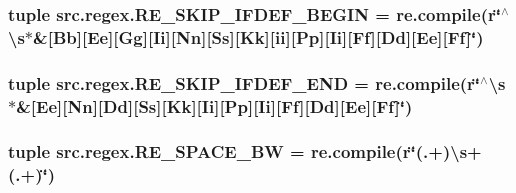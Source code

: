 \hypertarget{namespacesrc_1_1regex_a69046794f60d9286c57701374b9eb6b9}{
\subsubsection[{R\-E\-\_\-\-S\-K\-I\-P\-\_\-\-I\-F\-D\-E\-F\-\_\-\-B\-E\-G\-I\-N}]{\setlength{\rightskip}{0pt plus 5cm}tuple src.\-regex.\-R\-E\-\_\-\-S\-K\-I\-P\-\_\-\-I\-F\-D\-E\-F\-\_\-\-B\-E\-G\-I\-N = re.\-compile(r\char`\"{}$^\wedge$\textbackslash{}s$\ast$\&\mbox{[}Bb\mbox{]}\mbox{[}Ee\mbox{]}\mbox{[}Gg\mbox{]}\mbox{[}Ii\mbox{]}\mbox{[}Nn\mbox{]}\mbox{[}Ss\mbox{]}\mbox{[}Kk\mbox{]}\mbox{[}ii\mbox{]}\mbox{[}Pp\mbox{]}\mbox{[}Ii\mbox{]}\mbox{[}Ff\mbox{]}\mbox{[}Dd\mbox{]}\mbox{[}Ee\mbox{]}\mbox{[}Ff\mbox{]}\char`\"{})}}\label{namespacesrc_1_1regex_a69046794f60d9286c57701374b9eb6b9}
\hypertarget{namespacesrc_1_1regex_a0aa035996ed9ef61df34ad86849d7b04}{
\subsubsection[{R\-E\-\_\-\-S\-K\-I\-P\-\_\-\-I\-F\-D\-E\-F\-\_\-\-E\-N\-D}]{\setlength{\rightskip}{0pt plus 5cm}tuple src.\-regex.\-R\-E\-\_\-\-S\-K\-I\-P\-\_\-\-I\-F\-D\-E\-F\-\_\-\-E\-N\-D = re.\-compile(r\char`\"{}$^\wedge$\textbackslash{}s$\ast$\&\mbox{[}Ee\mbox{]}\mbox{[}Nn\mbox{]}\mbox{[}Dd\mbox{]}\mbox{[}Ss\mbox{]}\mbox{[}Kk\mbox{]}\mbox{[}Ii\mbox{]}\mbox{[}Pp\mbox{]}\mbox{[}Ii\mbox{]}\mbox{[}Ff\mbox{]}\mbox{[}Dd\mbox{]}\mbox{[}Ee\mbox{]}\mbox{[}Ff\mbox{]}\char`\"{})}}\label{namespacesrc_1_1regex_a0aa035996ed9ef61df34ad86849d7b04}
\hypertarget{namespacesrc_1_1regex_a8cb9e83aa28c0fcc989e80187ee4033c}{
\subsubsection[{R\-E\-\_\-\-S\-P\-A\-C\-E\-\_\-\-B\-W}]{\setlength{\rightskip}{0pt plus 5cm}tuple src.\-regex.\-R\-E\-\_\-\-S\-P\-A\-C\-E\-\_\-\-B\-W = re.\-compile(r\char`\"{}(.+)\textbackslash{}s+(.+)\char`\"{})}}\label{namespacesrc_1_1regex_a8cb9e83aa28c0fcc989e80187ee4033c}
